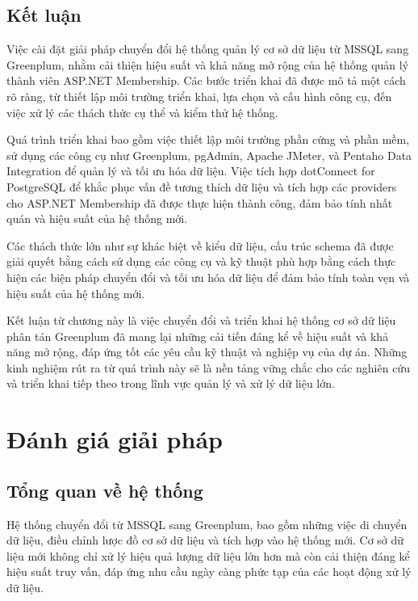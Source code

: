 \documentclass{article}[14pt]
\begin{document}
\subsection{Kết luận}

Việc cài đặt giải pháp chuyển đổi hệ thống quản lý cơ sở dữ liệu từ MSSQL sang Greenplum, nhằm cải thiện hiệu suất và khả năng mở rộng của hệ thống quản lý thành viên ASP.NET Membership. Các bước triển khai đã được mô tả một cách rõ ràng, từ thiết lập môi trường triển khai, lựa chọn và cấu hình công cụ, đến việc xử lý các thách thức cụ thể và kiểm thử hệ thống.

Quá trình triển khai bao gồm việc thiết lập môi trường phần cứng và phần mềm, sử dụng các công cụ như Greenplum, pgAdmin, Apache JMeter, và Pentaho Data Integration để quản lý và tối ưu hóa dữ liệu. Việc tích hợp dotConnect for PostgreSQL để khắc phục vấn đề tương thích dữ liệu và tích hợp các providers cho ASP.NET Membership đã được thực hiện thành công, đảm bảo tính nhất quán và hiệu suất của hệ thống mới.

Các thách thức lớn như sự khác biệt về kiểu dữ liệu, cấu trúc schema đã được giải quyết bằng cách sử dụng các công cụ và kỹ thuật phù hợp bằng cách thực hiện các biện pháp chuyển đổi và tối ưu hóa dữ liệu để đảm bảo tính toàn vẹn và hiệu suất của hệ thống mới.

Kết luận từ chương này là việc chuyển đổi và triển khai hệ thống cơ sở dữ liệu phân tán Greenplum đã mang lại những cải tiến đáng kể về hiệu suất và khả năng mở rộng, đáp ứng tốt các yêu cầu kỹ thuật và nghiệp vụ của dự án. Những kinh nghiệm rút ra từ quá trình này sẽ là nền tảng vững chắc cho các nghiên cứu và triển khai tiếp theo trong lĩnh vực quản lý và xử lý dữ liệu lớn.





\section{Đánh giá giải pháp}


\subsection{Tổng quan về hệ thống} 

Hệ thống chuyển đổi từ MSSQL sang Greenplum, bao gồm những việc di chuyển dữ liệu, điều chỉnh lược đồ cơ sở dữ liệu và tích hợp vào hệ thống mới. Cơ sở dữ liệu mới không chỉ xử lý hiệu quả lượng dữ liệu lớn hơn mà còn cải thiện đáng kể hiệu suất truy vấn, đáp ứng nhu cầu ngày càng phức tạp của các hoạt động xử lý dữ liệu.
\end{document}
